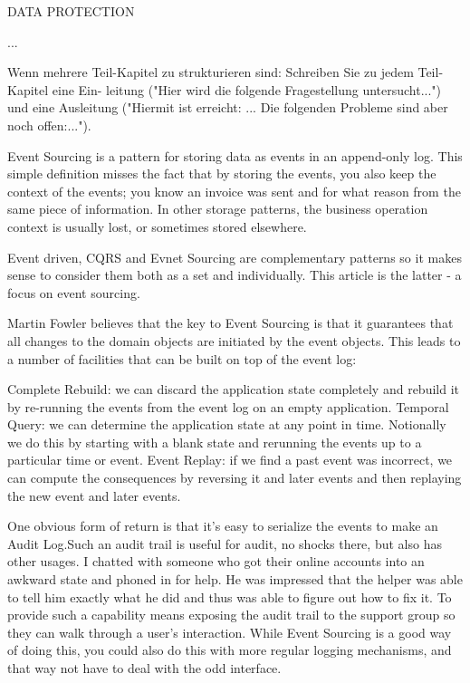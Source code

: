 DATA PROTECTION

...\citep{fowler2022es}

Wenn mehrere Teil-Kapitel zu strukturieren sind: Schreiben Sie zu jedem Teil-Kapitel eine Ein- leitung ("Hier wird die folgende Fragestellung untersucht...") und eine Ausleitung ("Hiermit ist erreicht: ... Die folgenden Probleme sind aber noch offen:...").

Event Sourcing is a pattern for storing data as events in an append-only log. This simple definition misses the fact that by storing the events, you also keep the context of the events; you know an invoice was sent and for what reason from the same piece of information. In other storage patterns, the business operation context is usually lost, or sometimes stored elsewhere. %

Event driven, CQRS and Evnet Sourcing are complementary patterns so it makes sense to consider them both as a set and individually. This article is the latter - a focus on event sourcing.



Martin Fowler believes that the key to Event Sourcing is that it guarantees that all changes to the domain objects are initiated by the event objects. This leads to a number of facilities that can be built on top of the event log:

Complete Rebuild: we can discard the application state completely and rebuild it by re-running the events from the event log on an empty application.
Temporal Query: we can determine the application state at any point in time. Notionally we do this by starting with a blank state and rerunning the events up to a particular time or event.
Event Replay: if we find a past event was incorrect, we can compute the consequences by reversing it and later events and then replaying the new event and later events. %

One obvious form of return is that it's easy to serialize the events to make an Audit Log.Such an audit trail is useful for audit, no shocks there, but also has other usages. I chatted with someone who got their online accounts into an awkward state and phoned in for help. He was impressed that the helper was able to tell him exactly what he did and thus was able to figure out how to fix it. To provide such a capability means exposing the audit trail to the support group so they can walk through a user's interaction. While Event Sourcing is a good way of doing this, you could also do this with more regular logging mechanisms, and that way not have to deal with the odd interface. %

